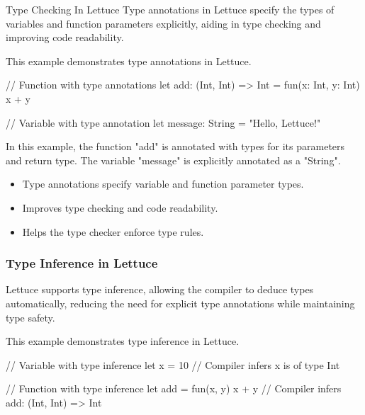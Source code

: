 \begin{notes}{Type Checking In Lettuce}
    Type annotations in Lettuce specify the types of variables and function parameters explicitly, aiding in type checking and improving code readability.
    
    \begin{highlight}
    
        This example demonstrates type annotations in Lettuce.
    
    \begin{code}[Lettuce]
    // Function with type annotations
    let add: (Int, Int) => Int = fun(x: Int, y: Int) {
        x + y
    }
    
    // Variable with type annotation
    let message: String = "Hello, Lettuce!"
    \end{code}
    
        In this example, the function "add" is annotated with types for its parameters and return type. The variable "message" is explicitly annotated as a "String".
    
        \begin{itemize}
            \item Type annotations specify variable and function parameter types.
            \item Improves type checking and code readability.
            \item Helps the type checker enforce type rules.
        \end{itemize}
    
    \end{highlight}
    
    \subsubsection*{Type Inference in Lettuce}
    
    Lettuce supports type inference, allowing the compiler to deduce types automatically, reducing the need for explicit type annotations while maintaining type safety.
    
    \begin{highlight}
    
        This example demonstrates type inference in Lettuce.
    
    \begin{code}[Lettuce]
    // Variable with type inference
    let x = 10  // Compiler infers x is of type Int
    
    // Function with type inference
    let add = fun(x, y) {
        x + y
    }  // Compiler infers add: (Int, Int) => Int
    \end{code}
    

\end{highlight}
\end{notes}
